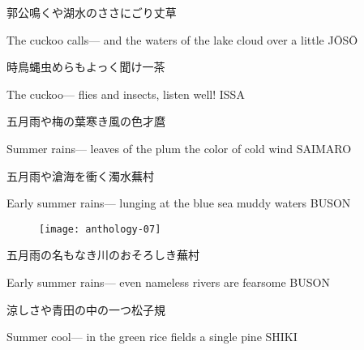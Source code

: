 \begin{haiku}
    {\FH 郭公鳴くや湖水のささにごり}\hfill{\FH 丈草}

    \vin{} The cuckoo calls---
    \vin{} \vin{} and the waters of the lake
    \vin{} \vin{} \vin{} cloud over a little \hspace{\fill} J\={O}S\={O}
\end{haiku}

\begin{haiku}
    {\FH 時鳥蝿虫めらもよっく聞け}\hfill{\FH 一茶}

    \vin{} The cuckoo---
    \vin{} \vin{} flies and insects,
    \vin{} \vin{} \vin{} listen well! \hspace{\fill} ISSA
\end{haiku}

\begin{haiku}
    {\FH 五月雨や梅の葉寒き風の色}\hfill{\FH 才麿}

    \vin{} Summer rains---
    \vin{} \vin{} leaves of the plum
    \vin{} \vin{} \vin{} the color of cold wind \hspace{\fill} SAIMARO
\end{haiku}

\begin{haiku}
    {\FH 五月雨や滄海を衝く濁水}\hfill{\FH 蕪村}

    \vin{} Early summer rains---
    \vin{} \vin{} lunging at the blue sea
    \vin{} \vin{} \vin{} muddy waters \hspace{\fill} BUSON
\end{haiku}

\begin{figure}
    \texttt{[image: anthology-07]}
\end{figure}

\begin{haiku}
    {\FH 五月雨の名もなき川のおそろしき}\hfill{\FH 蕪村}

    \vin{} Early summer rains---
    \vin{} \vin{} even nameless rivers
    \vin{} \vin{} \vin{} are fearsome \hspace{\fill} BUSON
\end{haiku}

\begin{haiku}
    {\FH 涼しさや青田の中の一つ松}\hfill{\FH 子規}

    \vin{} Summer cool---
    \vin{} \vin{} in the green rice fields
    \vin{} \vin{} \vin{} a single pine \hspace{\fill} SHIKI
\end{haiku}

